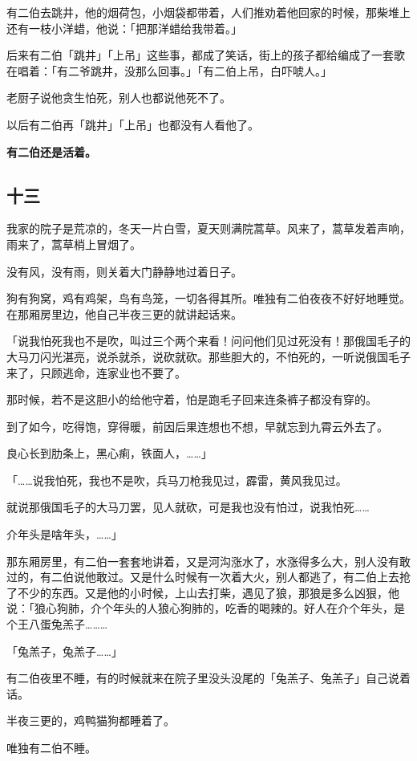 \documentclass[UTF8]{ctexart}
\begin{document}
有二伯去跳井，他的烟荷包，小烟袋都带着，人们推劝着他回家的时候，那柴堆上还有一枝小洋蜡，他说：「把那洋蜡给我带着。」

后来有二伯「跳井」「上吊」这些事，都成了笑话，街上的孩子都给编成了一套歌在唱着：「有二爷跳井，没那么回事。」「有二伯上吊，白吓唬人。」

老厨子说他贪生怕死，别人也都说他死不了。

以后有二伯再「跳井」「上吊」也都没有人看他了。

\textbf{有二伯还是活着。}

\subsection{十三}

我家的院子是荒凉的，冬天一片白雪，夏天则满院蒿草。风来了，蒿草发着声响，雨来了，蒿草梢上冒烟了。

没有风，没有雨，则关着大门静静地过着日子。

狗有狗窝，鸡有鸡架，鸟有鸟笼，一切各得其所。唯独有二伯夜夜不好好地睡觉。在那厢房里边，他自己半夜三更的就讲起话来。

「说我怕死我也不是吹，叫过三个两个来看！问问他们见过死没有！那俄国毛子的大马刀闪光湛亮，说杀就杀，说砍就砍。那些胆大的，不怕死的，一听说俄国毛子来了，只顾逃命，连家业也不要了。

那时候，若不是这胆小的给他守着，怕是跑毛子回来连条裤子都没有穿的。

到了如今，吃得饱，穿得暖，前因后果连想也不想，早就忘到九霄云外去了。

良心长到肋条上，黑心痢，铁面人，……」

「……说我怕死，我也不是吹，兵马刀枪我见过，霹雷，黄风我见过。

就说那俄国毛子的大马刀罢，见人就砍，可是我也没有怕过，说我怕死……

介年头是啥年头，……」

那东厢房里，有二伯一套套地讲着，又是河沟涨水了，水涨得多么大，别人没有敢过的，有二伯说他敢过。又是什么时候有一次着大火，别人都逃了，有二伯上去抢了不少的东西。又是他的小时候，上山去打柴，遇见了狼，那狼是多么凶狠，他说：「狼心狗肺，介个年头的人狼心狗肺的，吃香的喝辣的。好人在介个年头，是个王八蛋兔羔子………

「兔羔子，兔羔子……」

有二伯夜里不睡，有的时候就来在院子里没头没尾的「兔羔子、兔羔子」自己说着话。

半夜三更的，鸡鸭猫狗都睡着了。

唯独有二伯不睡。
\end{document}
